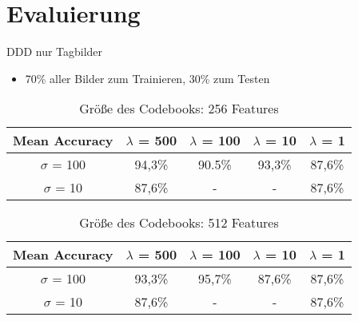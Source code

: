 \section{Evaluierung}
\begin{frame}[t,fragile]{DDD nur Tagbilder}
\begin{itemize}
	\item 70\% aller Bilder zum Trainieren, 30\% zum Testen
\end{itemize}
	\begin{table}
		\begin{tabular}{|c||c|c|c|c|}
			\hline
			Mean Accuracy & $\lambda$ = 500 & $\lambda$ = 100 & $\lambda$ = 10 & $\lambda$ = 1 \\
			\hline
			$\sigma$ = 100 & 94,3\% & 90.5\% & 93,3\% & 87,6\% \\ 
			\hline
			$\sigma$ = 10 & 87,6\% & - & - & 87,6\% \\
			\hline
		\end{tabular}
	\caption{Größe des Codebooks: 256 Features}
	\end{table}
		\begin{table}
		\begin{tabular}{|c||c|c|c|c|}
			\hline
			Mean Accuracy & $\lambda$ = 500 & $\lambda$ = 100 & $\lambda$ = 10 & $\lambda$ = 1 \\
			\hline
			$\sigma$ = 100 & 93,3\% & 95,7\% & 87,6\% & 87,6\% \\ 
			\hline
			$\sigma$ = 10 & 87,6\% & - & - & 87,6\% \\
			\hline
		\end{tabular}
		\caption{Größe des Codebooks: 512 Features}
	\end{table}
\end{frame}

